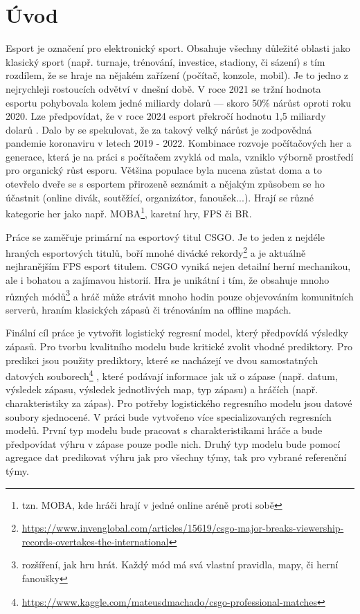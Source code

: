 \chapter{Úvod}
Esport je označení pro elektronický sport. Obsahuje všechny důležité oblasti jako klasický sport (např. turnaje, trénování, investice, stadiony, či sázení)
s tím rozdílem, že se hraje na nějakém zařízení (počítač, konzole, mobil).
Je to jedno z nejrychleji rostoucích odvětví v dnešní době. V roce 2021 se tržní hodnota esportu pohybovala kolem jedné miliardy dolarů --- skoro
50\% nárůst oproti roku 2020. Lze předpovídat, že v roce 2024 esport překročí hodnotu 1,5 miliardy dolarů \cite{gough_esports_2021}.
Dalo by se spekulovat, že za takový velký nárůst je zodpovědná 
pandemie koronaviru v letech 2019 - 2022. Kombinace rozvoje počítačových her a generace, která je na práci s počítačem zvyklá od mala, vzniklo výborně prostředí
pro organický růst esporu. Většina populace byla nucena zůstat doma a to otevřelo dveře
se s esportem přirozeně seznámit a nějakým způsobem se ho účastnit (online divák, soutěžící, organizátor, fanoušek...). 
Hrají se různé kategorie her jako např. \ac{MOBA}\footnote{tzn. MOBA, kde hráči hrají v jedné online aréně proti sobě},
karetní hry, \ac{FPS} či \ac{BR}.

Práce se zaměřuje primární na esportový titul \acf{CSGO}. Je to jeden z nejdéle hraných esportových titulů, boří mnohé divácké
rekordy\footnote{\scriptsize \url{https://www.invenglobal.com/articles/15619/csgo-major-breaks-viewership-records-overtakes-the-international}}
a je aktuálně nejhranějším \ac{FPS} esport titulem. \ac{CSGO} vyniká nejen detailní herní mechanikou, ale i bohatou a zajímavou historií. Hra
je unikátní i tím, že obsahuje mnoho různých módů\footnote{rozšíření, jak hru hrát. Každý mód má svá vlastní pravidla, mapy, či herní fanoušky}
a hráč může strávit mnoho hodin pouze objevováním komunitních serverů, hraním klasických zápasů či trénováním na offline mapách.

Finální cíl práce je vytvořit logistický regresní model, který předpovídá výsledky zápasů. Pro tvorbu kvalitního modelu bude kritické zvolit vhodné prediktory.
Pro predikci jsou použity prediktory, které se nacházejí ve dvou samostatných datových souborech\footnote{\url{https://www.kaggle.com/mateusdmachado/csgo-professional-matches}} 
, které podávají informace jak už o zápase (např. datum, výsledek zápasu, výsledek jednotlivých map, typ zápasu) a hráčích 
(např. charakteristiky za zápas). Pro potřeby logistického regresního modelu jsou datové soubory sjednocené.
V práci bude vytvořeno více specializovaných regresních modelů. První typ modelu bude pracovat s charakteristikami hráče a bude předpovídat výhru v zápase pouze podle nich.
Druhý typ modelu bude pomocí agregace dat predikovat výhru jak pro všechny týmy, tak pro vybrané referenční týmy.

